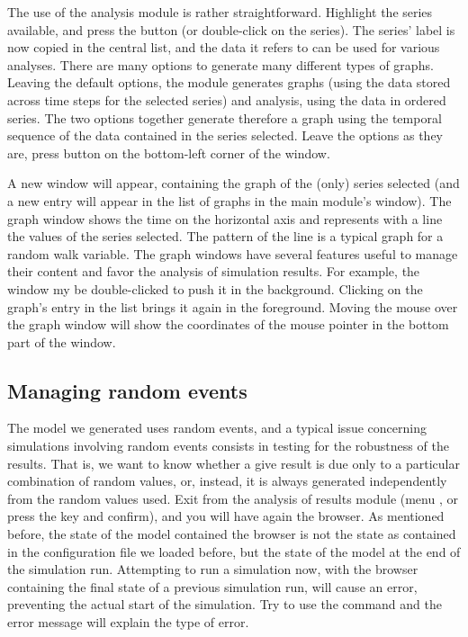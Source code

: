 \documentclass [11pt,a4paper] {book}
\begin{document}
The use of the analysis module is rather straightforward. Highlight the series available, and press the button \menu{$>$} (or double-click on the series). The series' label is now copied in the central list, and the data it refers to can be used for various analyses. There are many options to generate many different types of graphs. Leaving the default options, the module generates  graphs (using the data stored across time steps for the selected series) and  analysis, using the data in ordered series. The two options together generate therefore a graph using the temporal sequence of the data contained in the series selected. Leave the options as they are, press button  on the bottom-left corner of the window.

A new window will appear, containing the graph of the (only) series selected (and a new entry will appear in the list of graphs in the main module's window). The graph window shows the time on the horizontal axis and represents with a line the values of the series selected. The pattern of the line is a typical graph for a random walk variable. The graph windows have several features useful to manage their content and favor the analysis of simulation results. For example, the window my be double-clicked to push it in the background. Clicking on the graph's entry in the  list brings it again in the foreground. Moving the mouse over the graph window will show the coordinates of the mouse pointer in the bottom part of the window. 

\subsection{Managing random events}

The model we generated uses random events, and a typical issue concerning simulations involving random events consists in testing for the robustness of the results. That is, we want to know whether a give result is due only to a particular combination of random values, or, instead, it is always generated independently from the random values used. Exit from the analysis of results module (menu , or press the key  and confirm), and you will have again the browser. As mentioned before, the state of the model contained the browser is not the state as contained in the configuration file we loaded before, but the state of the model at the end of the simulation run. Attempting to run a simulation now, with the browser containing the final state of a previous simulation run, will cause an error, preventing the actual start of the simulation. Try to use the command  and the error message will explain the type of error.
\end{document}

